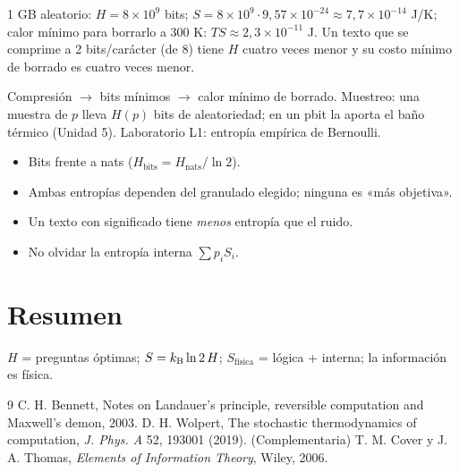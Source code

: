 \documentclass[11pt,a4paper]{article}
\begin{document}
\begin{ejemplo}
1 GB aleatorio: $H=8\times10^9$ bits; $S=8\times10^9\cdot9{,}57\times10^{-24}\approx7{,}7\times10^{-14}$ J/K;
calor mínimo para borrarlo a 300 K: $TS\approx2{,}3\times10^{-11}$ J. Un texto que se comprime a 2 bits/carácter (de 8)
tiene $H$ cuatro veces menor y su costo mínimo de borrado es cuatro veces menor.
\end{ejemplo}

\begin{aplicacion}
Compresión $\to$ bits mínimos $\to$ calor mínimo de borrado. Muestreo: una muestra de $p$ lleva $H(p)$ bits de
aleatoriedad; en un pbit la aporta el baño térmico (Unidad 5). Laboratorio L1: entropía empírica de Bernoulli.
\end{aplicacion}

\begin{error}
\begin{itemize}[nosep]
\item Bits frente a nats ($H_{\text{bits}}=H_{\text{nats}}/\ln2$).
\item Ambas entropías dependen del granulado elegido; ninguna es «más objetiva».
\item Un texto con significado tiene \emph{menos} entropía que el ruido.
\item No olvidar la entropía interna $\sum p_iS_i$.
\end{itemize}
\end{error}

\section{Resumen}
$H$ = preguntas óptimas; $S=k_{\mathrm B}\ln2\,H$; $S_{\text{física}}$ = lógica + interna; la información es física.

\begin{thebibliography}{9}\small
{} C. H. Bennett, Notes on Landauer's principle, reversible computation and Maxwell's demon, 2003.
 D. H. Wolpert, The stochastic thermodynamics of computation, \emph{J. Phys. A} 52, 193001 (2019).
 (Complementaria) T. M. Cover y J. A. Thomas, \emph{Elements of Information Theory}, Wiley, 2006.
\end{thebibliography}
\end{document}

